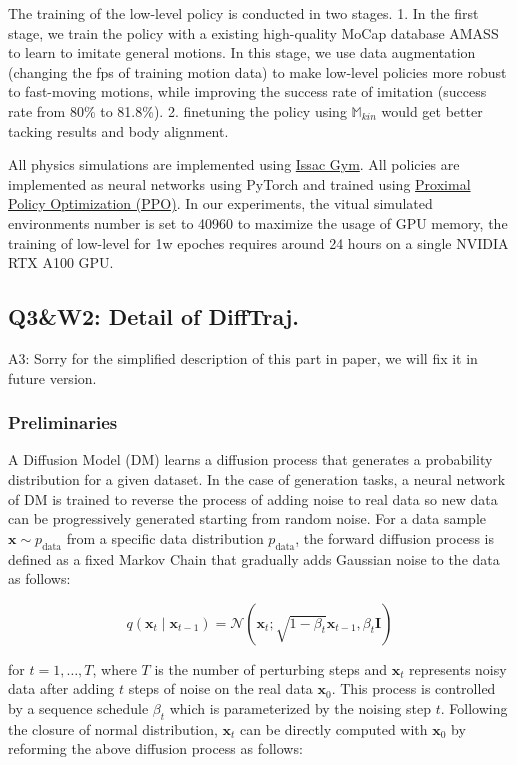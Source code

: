 \documentclass{article}
\begin{document}
The training of the low-level policy is conducted in two stages. 1. In the first stage, we train the policy with a existing high-quality MoCap database AMASS to learn to imitate general motions. In this stage, we use data augmentation (changing the fps of training motion data) to make low-level policies more robust to fast-moving motions, while improving the success rate of imitation (success rate from 80\% to 81.8\%). 2. finetuning the policy using $\mathbb{M}_{kin}$ would get better tacking results and body alignment.

All physics simulations are implemented using \href{https://developer.nvidia.com/isaac-gym}{Issac Gym}. All policies are implemented as neural networks using PyTorch and trained using \href{https://arxiv.org/pdf/1707.06347}{Proximal Policy Optimization (PPO)}. In our experiments, the vitual simulated environments number is set to 40960 to maximize the usage of GPU memory, the training of low-level for 1w epoches requires around 24 hours on a single NVIDIA RTX A100 GPU.

\subsection{Q3\&W2: Detail of DiffTraj.}\label{q3w2-detail-of-difftraj.}

A3: Sorry for the simplified description of this part in paper, we will fix it in future version.

\subsubsection{Preliminaries}\label{preliminaries}

A Diffusion Model (DM) learns a diffusion process that generates a probability distribution for a given dataset. In the case of generation tasks, a neural network of DM is trained to reverse the process of adding noise to real data so new data can be progressively generated starting from random noise. For a data sample $\mathbf{x} \sim p_{\text{data}}$ from a specific data distribution $p_{\text{data}}$, the forward diffusion process is defined as a fixed Markov Chain that gradually adds Gaussian noise to the data as follows:

\[
q(\mathbf{x}_t \mid \mathbf{x}_{t-1}) = \mathcal{N}(\mathbf{x}_t; \sqrt{1 - \beta_t}\mathbf{x}_{t-1}, \beta_t\mathbf{I})
\]

for $t = 1, \ldots, T$, where $T$ is the number of perturbing steps and $\mathbf{x}_t$ represents noisy data after adding $t$ steps of noise on the real data $\mathbf{x}_0$. This process is controlled by a sequence schedule $\beta_t$ which is parameterized by the noising step $t$. Following the closure of normal distribution, $\mathbf{x}_t$ can be directly computed with $\mathbf{x}_0$ by reforming the above diffusion process as follows:
\end{document}
